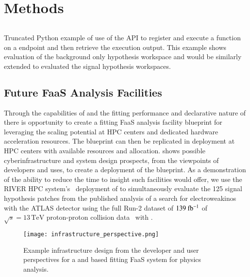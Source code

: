 \section{Methods}\label{sec:methods}
%

%


\begin{listing}
 \inputminted{python}{src/code/funcX_registration_example.py}
 \caption{Truncated Python example of use of the \funcX{} API to register and execute a \pyhf{} function on a \funcX{} endpoint and then retrieve the execution output.
 This example shows evaluation of the background only hypothesis workspace and would be similarly extended to evaluated the signal hypothesis workspaces.}
 \label{lst:funcX_registration_example}
\end{listing}

\subsection{Future FaaS Analysis Facilities}\label{subsec:FaaS_analysis_facilities}

Through the capabilities of \funcX{} and the fitting performance and declarative nature of \pyhf{} there is opportunity to create a fitting FaaS analysis facility blueprint for leveraging the scaling potential at HPC centers and dedicated hardware acceleration resources.
The blueprint can then be replicated in deployment at HPC centers with available resources and allocation.
 shows possible cyberinfrastructure and system design prospects, from the viewpoints of developers and uses, to create a deployment of the blueprint.
As a demonstration of the ability to reduce the time to insight such facilities would offer, we use the RIVER HPC system's~\cite{RIVER_HPC} deployment of \funcX{} to simultaneously evaluate the 125 signal hypothesis patches from the published analysis of a search for electroweakinos with the ATLAS detector using the full Run-2 dataset of \(139~\ifb\) of \(\sqrt{s} = 13\,\text{TeV}\) proton-proton collision data~\cite{SUSY-2019-08} with \pyhf{}.
\\

\begin{figure}[!htpb]
    \centering
    \texttt{[image: infrastructure\_perspective.png]}
    \caption{Example infrastructure design from the developer and user perspectives for a \pyhf{} and \funcX{} based fitting FaaS system for physics analysis.~\cite{portable_inference_workshop}}
    \label{fig:infrastructure_perspective}
\end{figure}
